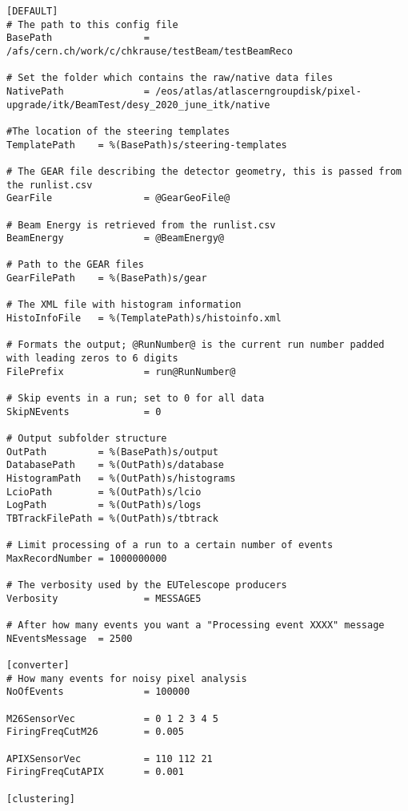 \clearpage

\begin{lstlisting}[caption={Configuration file of EUTelescope for the testbeam anaylsis of June 2020 Batch 3}]
[DEFAULT]
# The path to this config file
BasePath                = /afs/cern.ch/work/c/chkrause/testBeam/testBeamReco

# Set the folder which contains the raw/native data files
NativePath              = /eos/atlas/atlascerngroupdisk/pixel-upgrade/itk/BeamTest/desy_2020_june_itk/native

#The location of the steering templates
TemplatePath    = %(BasePath)s/steering-templates

# The GEAR file describing the detector geometry, this is passed from the runlist.csv
GearFile                = @GearGeoFile@

# Beam Energy is retrieved from the runlist.csv
BeamEnergy              = @BeamEnergy@

# Path to the GEAR files
GearFilePath    = %(BasePath)s/gear

# The XML file with histogram information
HistoInfoFile   = %(TemplatePath)s/histoinfo.xml

# Formats the output; @RunNumber@ is the current run number padded with leading zeros to 6 digits
FilePrefix              = run@RunNumber@

# Skip events in a run; set to 0 for all data
SkipNEvents             = 0

# Output subfolder structure
OutPath         = %(BasePath)s/output
DatabasePath    = %(OutPath)s/database
HistogramPath   = %(OutPath)s/histograms
LcioPath        = %(OutPath)s/lcio
LogPath         = %(OutPath)s/logs
TBTrackFilePath = %(OutPath)s/tbtrack

# Limit processing of a run to a certain number of events
MaxRecordNumber = 1000000000

# The verbosity used by the EUTelescope producers
Verbosity               = MESSAGE5

# After how many events you want a "Processing event XXXX" message
NEventsMessage  = 2500

[converter]
# How many events for noisy pixel analysis
NoOfEvents              = 100000

M26SensorVec            = 0 1 2 3 4 5
FiringFreqCutM26        = 0.005

APIXSensorVec           = 110 112 21
FiringFreqCutAPIX       = 0.001

[clustering]


\end{lstlisting}
